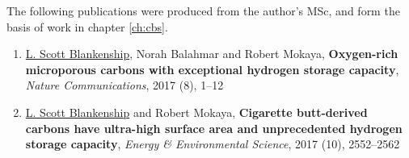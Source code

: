 The following publications were produced from the author's MSc, and form the basis of work in chapter \ref{ch:cbs}.

\begin{enumerate}[resume, label=\Roman*]
    \item \underline{L. Scott Blankenship}, Norah Balahmar and Robert Mokaya, \textbf{Oxygen-rich microporous carbons with exceptional hydrogen storage capacity}, \textit{Nature Communications}, 2017 (8), 1–12
    \item \underline{L. Scott Blankenship} and Robert Mokaya, \textbf{Cigarette butt-derived carbons have ultra-high surface area and unprecedented hydrogen storage capacity}, \textit{Energy \& Environmental Science}, 2017 (10), 2552–2562
    
\end{enumerate}